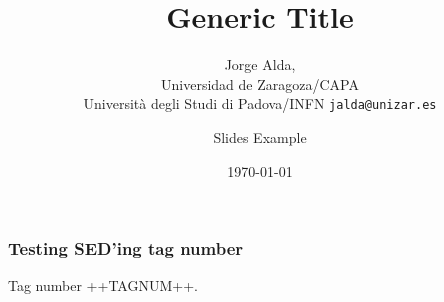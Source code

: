 \documentclass[mathserif, 10pt, aspectratio=169]{beamer}
\title{Generic Title}
\subtitle{Jorge Alda,\\ Universidad de Zaragoza/CAPA\\
Università degli Studi di Padova/INFN \hspace{4em} \texttt{jalda@unizar.es} }
\author[Jorge Alda]{Slides Example}
\date[Conference]{\today}
\begin{document}
\begin{frame}

\titlepage

\end{frame}


\begin{frame}
\frametitle{Testing SED'ing tag number}
Tag number ++TAGNUM++.
\end{frame}
\end{document}
